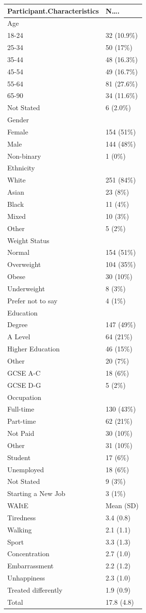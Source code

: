 \documentclass[
  number,
  preprint]{elsarticle}
\begin{document}
\begin{longtable}[]{@{}ll@{}}
\toprule\noalign{}
Participant.Characteristics & N\ldots. \\
\midrule\noalign{}
\endhead
\bottomrule\noalign{}
\endlastfoot
Age & \\
18-24 & 32 (10.9\%) \\
25-34 & 50 (17\%) \\
35-44 & 48 (16.3\%) \\
45-54 & 49 (16.7\%) \\
55-64 & 81 (27.6\%) \\
65-90 & 34 (11.6\%) \\
Not Stated & 6 (2.0\%) \\
Gender & \\
Female & 154 (51\%) \\
Male & 144 (48\%) \\
Non-binary & 1 (0\%) \\
Ethnicity & \\
White & 251 (84\%) \\
Asian & 23 (8\%) \\
Black & 11 (4\%) \\
Mixed & 10 (3\%) \\
Other & 5 (2\%) \\
Weight Status & \\
Normal & 154 (51\%) \\
Overweight & 104 (35\%) \\
Obese & 30 (10\%) \\
Underweight & 8 (3\%) \\
Prefer not to say & 4 (1\%) \\
Education & \\
Degree & 147 (49\%) \\
A Level & 64 (21\%) \\
Higher Education & 46 (15\%) \\
Other & 20 (7\%) \\
GCSE A-C & 18 (6\%) \\
GCSE D-G & 5 (2\%) \\
Occupation & \\
Full-time & 130 (43\%) \\
Part-time & 62 (21\%) \\
Not Paid & 30 (10\%) \\
Other & 31 (10\%) \\
Student & 17 (6\%) \\
Unemployed & 18 (6\%) \\
Not Stated & 9 (3\%) \\
Starting a New Job & 3 (1\%) \\
WAItE & Mean (SD) \\
Tiredness & 3.4 (0.8) \\
Walking & 2.1 (1.1) \\
Sport & 3.3 (1.3) \\
Concentration & 2.7 (1.0) \\
Embarrassment & 2.2 (1.2) \\
Unhappiness & 2.3 (1.0) \\
Treated differently & 1.9 (0.9) \\
Total & 17.8 (4.8) \\


\end{longtable}
\end{document}
